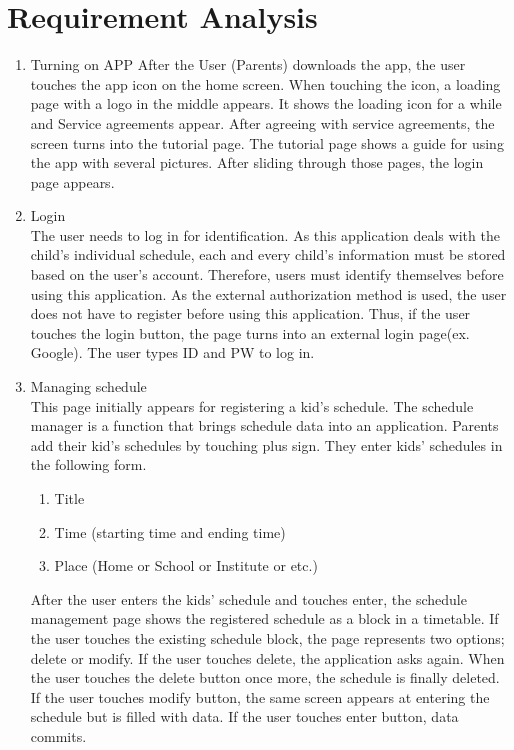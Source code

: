 \documentclass[conference]{IEEEtran}
\begin{document}
\section{\Large{Requirement Analysis}}
\begin{enumerate}[label=\arabic*.] 
    \item {\large{Turning on APP}} \newline
    After the User (Parents) downloads the app, the user touches the app icon on the home screen. When touching the icon, a loading page with a logo in the middle appears. It shows the loading icon for a while and Service agreements appear. After agreeing with service agreements, the screen turns into the tutorial page. The tutorial page shows a guide for using the app with several pictures. After sliding through those pages, the login page appears. \\
    \item {\large{Login}} \\    
    The user needs to log in for identification. As this application deals with the child’s individual schedule, each and every child’s information must be stored based on the user’s account. Therefore, users must identify themselves before using this application. As the external authorization method is used, the user does not have to register before using this application. Thus, if the user touches the login button, the page turns into an external login page(ex. Google). The user types ID and PW to log in. \\
    \item {\large{Managing schedule}} \\        
    This page initially appears for registering a kid’s schedule. The schedule manager is a function that brings schedule data into an application. Parents add their kid’s schedules by touching plus sign. They enter kids’ schedules in the following form. \\
    \begin{enumerate}[label=\alph*.]
        \item Title
        \item Time (starting time and ending time)
        \item Place (Home or School or Institute or etc.)\\
    \end{enumerate}
    After the user enters the kids’ schedule and touches enter, the schedule management page shows the registered schedule as a block in a timetable. If the user touches the existing schedule block, the page represents two options; delete or modify. If the user touches delete, the application asks again. When the user touches the delete button once more, the schedule is finally deleted. If the user touches modify button, the same screen appears at entering the schedule but is filled with data. If the user touches enter button, data commits.\\

\end{enumerate}
\end{document}
